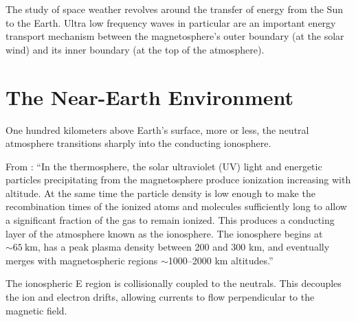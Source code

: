 

The study of space weather revolves around the transfer of energy from the Sun to the Earth. Ultra low frequency waves in particular are an important energy transport mechanism between the magnetosphere's outer boundary (at the solar wind) and its inner boundary (at the top of the atmosphere). 

\section{The Near-Earth Environment}


One hundred kilometers above Earth's surface, more or less, the neutral atmosphere transitions sharply into the conducting ionosphere.

From \cite{paschmann_2003}: ``In the thermosphere, the solar ultraviolet (UV) light and energetic particles precipitating from the magnetosphere produce ionization increasing with altitude. At the same time the particle density is low enough to make the recombination times of the ionized atoms and molecules sufficiently long to allow a significant fraction of the gas to remain ionized. This produces a conducting layer of the atmosphere known as the ionosphere. The ionosphere begins at $\sim\SI{65}{\km}$, has a peak plasma density between 200 and 300 km, and eventually merges with magnetospheric regions $\sim$1000--2000 km altitudes.''

The ionospheric E region is collisionally coupled to the neutrals. This decouples the ion and electron drifts, allowing currents to flow perpendicular to the magnetic field. 

